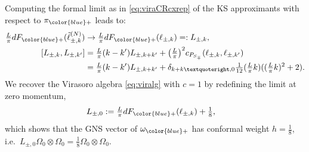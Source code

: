 \documentclass[a4paper, 11pt]{article}
\DeclareMathOperator{\1}{\mathds{1}}
\begin{document}
\medskip

Computing the formal limit as in \eqref{eq:viraCRcxrep} of the KS approximants with respect to $\pi_{{\color{blue}+}}$ leads to:
\begin{align}
\label{eq:viraCRcxrepR}
\tfrac{L}{\pi}dF_{{\color{blue}+}}(\tilde{\ell}^{(N)}_{\pm,k}) & \rightarrow \tfrac{L}{\pi}dF_{{\color{blue}+}}(\ell_{\pm,k}) =: L_{\pm,k}, \\ \nonumber
[L_{\pm,k},L_{\pm,k'}] & = \tfrac{L}{\pi}(k-k')L_{\pm,k+k'} + \big(\tfrac{L}{\pi}\big)^{2}c_{P_{S_{\mp}}}(\ell_{\pm,k},\ell_{\pm,k'}) \\ \nonumber
& = \tfrac{L}{\pi}(k-k')L_{\pm,k+k'} + \delta_{k+k’,0}\tfrac{1}{12}(\tfrac{L}{\pi}k)((\tfrac{L}{\pi}k)^2+2).
\end{align}
We recover the Virasoro algebra \eqref{eq:viralg} with $c=1$ by redefining the limit at zero momentum,
\begin{align}
\label{eq:zeromodeR}
L_{\pm,0} & := \tfrac{L}{\pi}dF_{{\color{blue}+}}(\ell_{\pm,k})+\tfrac{1}{8},
\end{align}
which shows that the GNS vector of $\omega_{{\color{blue}+}}$ has conformal weight $h=\tfrac{1}{8}$, i.e.~$L_{\pm,0}\Omega_{0}\otimes\Omega_{0} = \tfrac{1}{8}\Omega_{0}\otimes\Omega_{0}$.
\end{document}
